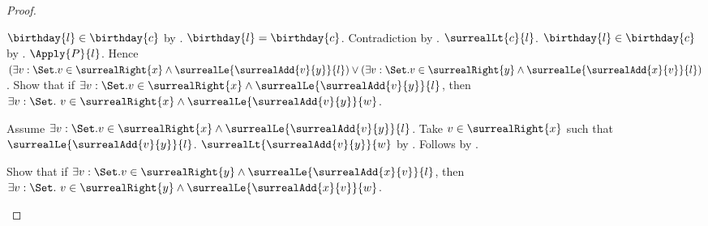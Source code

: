\begin{proof}
\begin{subproof}
\begin{subproof}
\begin{subproof}
\begin{byCase}
                    \begin{byCase}
                            $\birthday{l}\in\birthday{c}$
                                by .
                            $\birthday{l}=\birthday{c}$.
                            Contradiction by .
                            $\surrealLt{c}{l}$.
                            $\birthday{l}\in\birthday{c}$
                                by .
                            $\Apply{P}{l}$.
                            Hence $(\exists v:\Set.
                                    v\in\surrealRight{x}\land
                                    \surrealLe{\surrealAdd{v}{y}}{l})
                                \lor
                                (\exists v:\Set.
                                    v\in\surrealRight{y}\land
                                    \surrealLe{\surrealAdd{x}{v}}{l})$.
                            Show that if $\exists v:\Set.
                                    v\in\surrealRight{x}\land
                                    \surrealLe{\surrealAdd{v}{y}}{l}$, then
                                $\exists v:\Set.\ v\in\surrealRight{x}\land
                                    \surrealLe{\surrealAdd{v}{y}}{w}$.
                            \begin{subproof}
                                Assume $\exists v:\Set.
                                    v\in\surrealRight{x}\land
                                    \surrealLe{\surrealAdd{v}{y}}{l}$.
                                Take $v\in\surrealRight{x}$ such that
                                    $\surrealLe{\surrealAdd{v}{y}}{l}$.
                                $\surrealLt{\surrealAdd{v}{y}}{w}$
                                    by .
                                Follows by .
                            \end{subproof}
                            Show that if $\exists v:\Set.
                                    v\in\surrealRight{y}\land
                                    \surrealLe{\surrealAdd{x}{v}}{l}$, then
                                $\exists v:\Set.\ v\in\surrealRight{y}\land
                                    \surrealLe{\surrealAdd{x}{v}}{w}$.
\end{byCase}
\end{byCase}
\end{subproof}
\end{subproof}
\end{subproof}
\end{proof}
